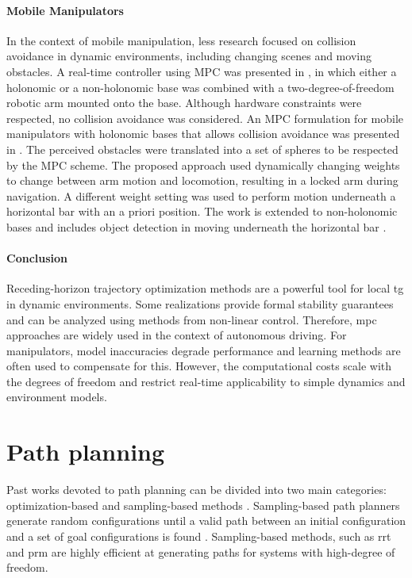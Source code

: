\paragraph{Mobile Manipulators}

In the context of mobile manipulation, less research focused on collision
avoidance in dynamic environments, including changing scenes and moving
obstacles. A real-time controller using MPC was presented in \cite{Ide2011}, in
which either a holonomic or a non-holonomic base was combined with a
two-degree-of-freedom robotic arm mounted onto the base. Although hardware
constraints were respected, no collision avoidance was considered.  An MPC
formulation for mobile manipulators with holonomic bases that allows collision
avoidance was presented in \cite{Avanzini2015}. The perceived obstacles were
translated into a set of spheres to be respected by the MPC scheme. The proposed
approach used dynamically changing weights to change between arm motion and
locomotion, resulting in a locked arm during navigation. A different weight
setting was used to perform motion underneath a horizontal bar with an a priori
position. The work is extended to non-holonomic bases and includes object
detection in moving underneath the horizontal bar \cite{Avanzini2018}. 


\paragraph{Conclusion}

Receding-horizon trajectory optimization methods are a
powerful tool for local \ac{tg} in dynamic environments.
Some realizations provide formal stability guarantees and can be analyzed
using methods from non-linear control. Therefore, \ac{mpc}
approaches are widely used in the context of autonomous
driving. For manipulators, model inaccuracies degrade
performance and learning methods are often used to
compensate for this. However, the computational costs scale
with the degrees of freedom and restrict real-time
applicability to simple dynamics and environment models.

\section{Path planning}
\label{sec:path_planning}

Past works devoted to path planning can be divided into two
main categories: optimization-based and sampling-based
methods \cite{LaValle2006,Mukadam2017}. Sampling-based path
planners generate random configurations until a valid path
between an initial configuration and a set of goal
configurations is found \cite{Karaman2011}. Sampling-based
methods, such as \acf{rrt}
\cite{Webb2013,Kleinbort2019,Kuffner2000} and \acf{prm}
\cite{Hsu2002,Faust2017} are highly
efficient at generating paths for systems with high-degree
of freedom.

